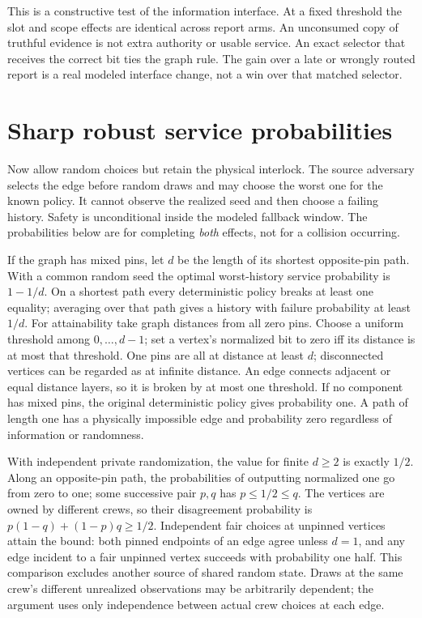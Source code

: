 \documentclass[11pt]{article}
\begin{document}
This is a constructive test of the information interface. At a fixed
threshold the slot and scope effects are identical across report
arms. An unconsumed copy of truthful evidence is not extra authority
or usable service. An exact selector that receives the correct bit
ties the graph rule. The gain over a late or wrongly routed report
is a real modeled interface change, not a win over that matched
selector.

\section{Sharp robust service probabilities}
Now allow random choices but retain the physical interlock. The
source adversary selects the edge before random draws and may choose
the worst one for the known policy. It cannot observe the realized
seed and then choose a failing history. Safety is unconditional
inside the modeled fallback window. The probabilities below are
for completing \emph{both} effects, not for a collision occurring.

If the graph has mixed pins, let \(d\) be the length of its shortest
opposite-pin path. With a common random seed the optimal worst-history
service probability is \(1-1/d\). On a shortest path every deterministic
policy breaks at least one equality; averaging over that path gives
a history with failure probability at least \(1/d\).
For attainability take graph distances from all zero pins. Choose a
uniform threshold among \(0,\ldots,d-1\); set a vertex's normalized
bit to zero iff its distance is at most that threshold. One pins
are all at distance at least \(d\); disconnected vertices can be
regarded as at infinite distance. An edge connects adjacent or equal
distance layers, so it is broken by at most one threshold. If no
component has mixed pins, the original deterministic policy gives
probability one. A path of length one has a physically impossible
edge and probability zero regardless of information or randomness.

With independent private randomization, the value for finite
\(d\geq2\) is exactly \(1/2\). Along an opposite-pin path, the
probabilities of outputting normalized one go from zero to one;
some successive pair \(p,q\) has \(p\leq1/2\leq q\).
The vertices are owned by different crews, so their disagreement
probability is \(p(1-q)+(1-p)q\geq1/2\). Independent fair choices at
unpinned vertices attain the bound: both pinned endpoints of an edge
agree unless \(d=1\), and any edge incident to a fair unpinned vertex
succeeds with probability one half. This comparison excludes another
source of shared random state. Draws at the same crew's different
unrealized observations may be arbitrarily dependent; the argument
uses only independence between actual crew choices at each edge.
\end{document}
